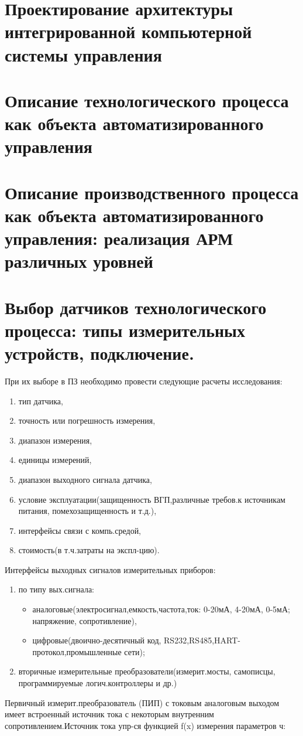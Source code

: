 \documentclass[unicode, 12pt, a4paper, oneside]{article}
\begin{document}
\section{Проектирование  архитектуры интегрированной компьютерной системы управления }

\section{Описание технологического процесса как объекта автоматизированного управления }

\section{Описание производственного процесса как объекта автоматизированного управления: реализация АРМ различных уровней}

\section{Выбор датчиков технологического процесса: типы измерительных устройств,  подключение.}

При их выборе в ПЗ необходимо провести следующие расчеты исследования:
\begin{enumerate}
\item тип датчика,
\item точность или погрешность измерения,
\item диапазон измерения,
\item единицы измерений,
\item диапазон выходного сигнала датчика,
\item условие эксплуатации(защищенность ВГП,различные требов.к источникам питания, помехозащищенность и т.д.), 
\item интерфейсы связи с компь.средой,
\item стоимость(в т.ч.затраты на экспл-цию).
\end{enumerate}
Интерфейсы выходных сигналов измерительных приборов:
\begin{enumerate}
 \item по типу вых.сигнала:
 \begin{itemize}
 \item аналоговые(электросигнал,емкость,частота,ток: 0-20мА, 4-20мА, 0-5мА; напряжение, сопротивление),
 \item цифровые(двоично-десятичный код, RS232,RS485,HART-протокол,промышленные сети);
 \end{itemize}
\item вторичные измерительные преобразователи(измерит.мосты, самописцы, программируемые логич.контроллеры и др.)
\end{enumerate}
Первичный измерит.преобразователь (ПИП) с токовым аналоговым выходом имеет встроенный источник тока с некоторым внутренним сопротивлением.Источник тока упр-ся функцией f(x) измерения параметров ч:
\end{document}
